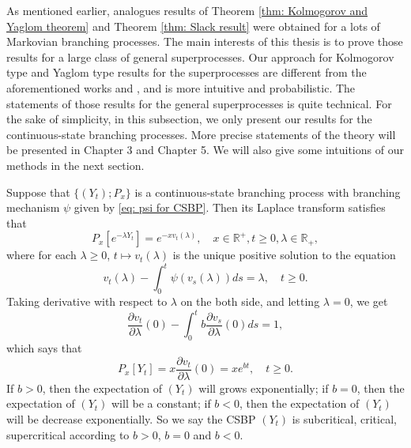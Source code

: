\documentclass[UTF8]{pkuthss}
\theoremstyle{plain}
\theoremstyle{definition}
\numberwithin{equation}{section}
\begin{document}
	As mentioned earlier, analogues results of Theorem \ref{thm: Kolmogorov and Yaglom theorem} and Theorem \ref{thm: Slack result} were obtained for a lots of Markovian branching processes. 
	The main interests of this thesis is to prove those results for a large class of general superprocesses. Our approach for Kolmogorov type and Yaglom type results for the superprocesses are different from the aforementioned works \cite{EvansPerkins1990Measurevalued} and \cite{RenSongZhang2015Limit}, and is more intuitive and probabilistic. 
	The statements of those results for the general superprocesses is quite technical. For the sake of simplicity, in this subsection, we only present our results for the continuous-state branching processes. 
	More precise statements of the theory will be presented in Chapter 3 and Chapter 5. 
	We will also give some intuitions of our methods in the next section.

	Suppose that $\{(Y_t);P_x\}$ is a continuous-state branching process with branching mechanism $\psi$ given by \eqref{eq: psi for CSBP}. Then its Laplace transform satisfies that
\[
	P_x[e^{-\lambda Y_t}] = e^{-xv_t(\lambda)}, \quad x\in \mathbb R^+, t\geq 0, \lambda \in \mathbb R_+,
\]
	where for each $\lambda \geq 0$, $t\mapsto v_t(\lambda)$ is the unique positive solution to the equation
\[
	v_t(\lambda) - \int_0^t \psi(v_s(\lambda))ds = \lambda,\quad t\geq 0.
\]
	Taking derivative with respect to $\lambda$ on the both side, and letting $\lambda = 0$, we get
\[
	\frac{\partial v_t}{\partial \lambda}(0) - \int_0^t b \frac{\partial v_s}{\partial \lambda}(0) ds
	= 1,
\]
	which says that
\[
	P_x[Y_t] = x\frac{\partial v_t}{\partial \lambda}(0) =x e^{bt},\quad t\geq 0.
\]
	If $b > 0$, then the expectation of $(Y_t)$ will grows exponentially; if $b=0$, then the expectation of $(Y_t)$ will be a constant; if $b< 0$, then the expectation of $(Y_t)$ will be decrease exponentially. 
	So we say the CSBP $(Y_t)$ is subcritical, critical, supercritical according to $b>0$, $b=0$ and $b <0$.  
\end{document}
